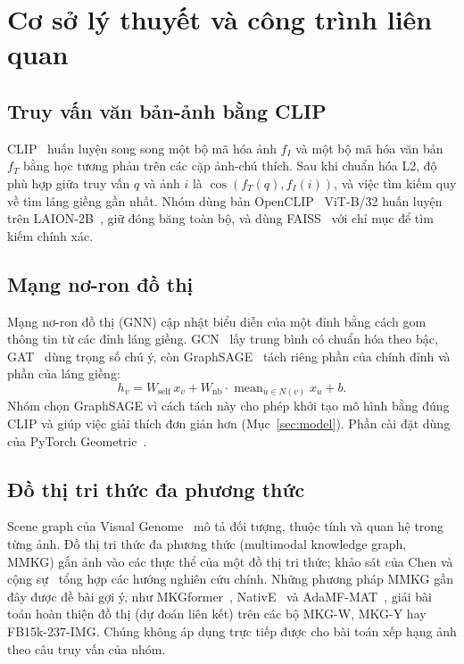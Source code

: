 \section{Cơ sở lý thuyết và công trình liên quan}
\label{sec:background}

\subsection{Truy vấn văn bản-ảnh bằng CLIP}
CLIP~\cite{radford2021clip} huấn luyện song song một bộ mã hóa ảnh $f_I$ và một bộ mã hóa văn bản $f_T$ bằng học tương phản trên các cặp ảnh-chú thích. Sau khi chuẩn hóa L2, độ phù hợp giữa truy vấn $q$ và ảnh $i$ là $\cos(f_T(q), f_I(i))$, và việc tìm kiếm quy về tìm láng giềng gần nhất. Nhóm dùng bản OpenCLIP~\cite{cherti2023openclip} ViT-B/32 huấn luyện trên LAION-2B~\cite{schuhmann2022laion}, giữ đóng băng toàn bộ, và dùng FAISS~\cite{johnson2019faiss} với chỉ mục  để tìm kiếm chính xác.

\subsection{Mạng nơ-ron đồ thị}
Mạng nơ-ron đồ thị (GNN) cập nhật biểu diễn của một đỉnh bằng cách gom thông tin từ các đỉnh láng giềng. GCN~\cite{kipf2017gcn} lấy trung bình có chuẩn hóa theo bậc, GAT~\cite{velickovic2018gat} dùng trọng số chú ý, còn GraphSAGE~\cite{hamilton2017sage} tách riêng phần của chính đỉnh và phần của láng giềng:
\begin{equation}
h_v = W_{\text{self}}\,x_v + W_{\text{nb}}\cdot \operatorname{mean}_{u\in N(v)} x_u + b.
\end{equation}
Nhóm chọn GraphSAGE vì cách tách này cho phép khởi tạo mô hình bằng đúng CLIP và giúp việc giải thích đơn giản hơn (Mục~\ref{sec:model}). Phần cài đặt dùng  của PyTorch Geometric~\cite{fey2019pyg}.

\subsection{Đồ thị tri thức đa phương thức}
Scene graph của Visual Genome~\cite{krishna2017vg} mô tả đối tượng, thuộc tính và quan hệ trong từng ảnh. Đồ thị tri thức đa phương thức (multimodal knowledge graph, MMKG) gắn ảnh vào các thực thể của một đồ thị tri thức; khảo sát của Chen và cộng sự~\cite{chen2024kgmm} tổng hợp các hướng nghiên cứu chính. Những phương pháp MMKG gần đây được đề bài gợi ý, như MKGformer~\cite{chen2022mkgformer}, NativE~\cite{zhang2024native} và AdaMF-MAT~\cite{zhang2024adamf}, giải bài toán hoàn thiện đồ thị (dự đoán liên kết) trên các bộ MKG-W, MKG-Y hay FB15k-237-IMG. Chúng không áp dụng trực tiếp được cho bài toán xếp hạng ảnh theo câu truy vấn của nhóm.

